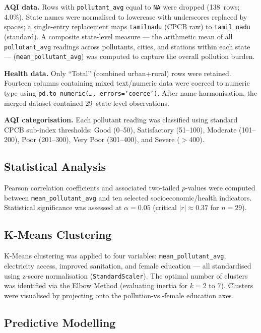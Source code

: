 \documentclass[10pt, conference]{IEEEtran}
\begin{document}
\textbf{AQI data.}
Rows with \texttt{pollutant\_avg} equal to \texttt{NA} were
dropped (138~rows; 4.0\%).
State names were normalised to lowercase with underscores
replaced by spaces; a single-entry replacement maps
\texttt{tamilnadu} (CPCB raw) to \texttt{tamil nadu}
(standard).
A composite state-level measure --- the arithmetic mean of
all \texttt{pollutant\_avg} readings across pollutants,
cities, and stations within each state ---
(\texttt{mean\_pollutant\_avg}) was computed to capture the
overall pollution burden.

\textbf{Health data.}
Only ``Total'' (combined urban+rural) rows were retained.
Fourteen columns containing mixed text/numeric data were
coerced to numeric type using
\texttt{pd.to\_numeric(\ldots, errors=`coerce')}.
After name harmonisation, the merged dataset contained
29~state-level observations.

\textbf{AQI categorisation.}
Each pollutant reading was classified using standard CPCB
sub-index thresholds: Good (0--50), Satisfactory (51--100),
Moderate (101--200), Poor (201--300), Very Poor (301--400),
and Severe ($>$400).

\subsection{Statistical Analysis}

Pearson correlation coefficients and associated two-tailed
$p$-values were computed between \texttt{mean\_pollutant\_avg}
and ten selected socioeconomic/health indicators.
Statistical significance was assessed at $\alpha = 0.05$
(critical $|r| \approx 0.37$ for $n = 29$).

\subsection{K-Means Clustering}

K-Means clustering was applied to four variables:
\texttt{mean\_pollutant\_avg}, electricity access, improved
sanitation, and female education --- all standardised using
z-score normalisation (\texttt{StandardScaler}).
The optimal number of clusters was identified via the Elbow
Method (evaluating inertia for $k = 2$ to $7$).
Clusters were visualised by projecting onto the
pollution-vs.-female education axes.

\subsection{Predictive Modelling}
\end{document}
